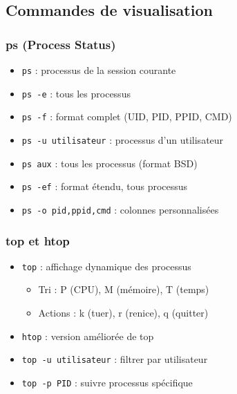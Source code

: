 \documentclass[12pt,a4paper]{article}
\begin{document}

\subsection{Commandes de visualisation}

\subsubsection{ps (Process Status)}
\begin{itemize}
    \item \texttt{ps} : processus de la session courante %
    \item \texttt{ps -e} : tous les processus %
    \item \texttt{ps -f} : format complet (UID, PID, PPID, CMD) %
    \item \texttt{ps -u utilisateur} : processus d'un utilisateur %
    \item \texttt{ps aux} : tous les processus (format BSD) %
    \item \texttt{ps -ef} : format étendu, tous processus %
    \item \texttt{ps -o pid,ppid,cmd} : colonnes personnalisées %
\end{itemize}

\subsubsection{top et htop}
\begin{itemize}
    \item \texttt{top} : affichage dynamique des processus %
    \begin{itemize}
        \item Tri : P (CPU), M (m\'emoire), T (temps) %
        \item Actions : k (tuer), r (renice), q (quitter) %
    \end{itemize}
    \item \texttt{htop} : version am\'elior\'ee de top %
    \item \texttt{top -u utilisateur} : filtrer par utilisateur %
    \item \texttt{top -p PID} : suivre processus sp\'ecifique %
\end{itemize}
\end{document}

